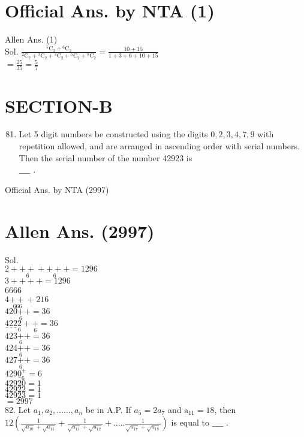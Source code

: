 \documentclass[10pt]{article}
\begin{document}
\section*{Official Ans. by NTA (1)}
Allen Ans. (1)\\
Sol. \(\frac{{ }^{5} \mathrm{C}_{2}+{ }^{6} \mathrm{C}_{2}}{{ }^{2} \mathrm{C}_{2}+{ }^{3} \mathrm{C}_{2}+{ }^{4} \mathrm{C}_{2}+{ }^{5} \mathrm{C}_{2}+{ }^{8} \mathrm{C}_{2}}=\frac{10+15}{1+3+6+10+15}\)\\
\(=\frac{25}{35}=\frac{5}{7}\)

\section*{SECTION-B}
\begin{enumerate}
  \setcounter{enumi}{80}
  \item Let 5 digit numbers be constructed using the digits \(0,2,3,4,7,9\) with repetition allowed, and are arranged in ascending order with serial numbers. Then the serial number of the number 42923 is\\
\(\_\_\_\_\) .
\end{enumerate}

Official Ans. by NTA (2997)

\section*{Allen Ans. (2997)}
Sol.\\
\(2+\underset{6}{++}+\underset{6}{++}+=1296\)\\
\(3++++=1296\)\\
6666\\
\(4 \underset{666}{++}+216\)\\
\(420 \underset{6}{+}+=36\)\\
\(\underline{4} \underline{2} \underline{2} \underset{6}{2}+\underset{6}{+}=36\)\\
\(423 \underset{6}{+}+=36\)\\
\(424 \underset{6}{+}+=36\)\\
\(427 \underset{6}{+}+=36\)\\
\(429 \underline{0}_{6}^{+}=6\)\\
\(42920=1\)\\
\(42922=1\)\\
\(42923=1\)\\
\(=2997\)\\
82. Let \(a_{1}, a_{2}, \ldots \ldots, a_{n}\) be in A.P. If \(a_{5}=2 a_{7}\) and \(\mathrm{a}_{11}=18\), then\\
\(12\left(\frac{1}{\sqrt{a_{10}}+\sqrt{a_{11}}}+\frac{1}{\sqrt{a_{11}}+\sqrt{a_{12}}}+\ldots . . \frac{1}{\sqrt{a_{17}}+\sqrt{a_{18}}}\right)\) is equal to \(\_\_\_\_\) .
\end{document}
